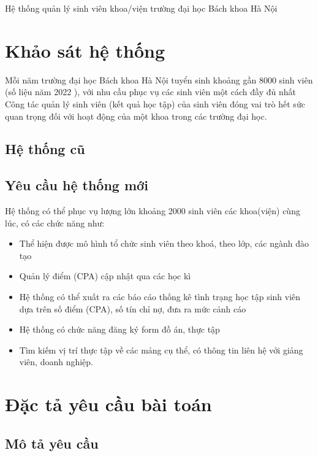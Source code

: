 \documentclass[12pt, a4paper]{report}
\begin{document}
Hệ thống quản lý sinh viên khoa/viện trường đại học Bách khoa Hà Nội
\chapter{Khảo sát hệ thống}
Mỗi năm trường đại học Bách khoa Hà Nội tuyển sinh khoảng gần 8000 sinh viên (số liệu năm 2022 ), với nhu cầu phục vụ các sinh viên một cách đầy đủ nhất\\
Công tác quản lý sinh viên (kết quả học tập) của sinh viên đóng vai trò hết sức quan trọng đối với hoạt động của một khoa trong các trường đại học.
\section{Hệ thống cũ}

\section{Yêu cầu hệ thống mới}
Hệ thống có thể phục vụ lượng lớn khoảng 2000
sinh viên các khoa(viện) cùng lúc, có các chức năng như:
\begin{itemize}
    \item Thể hiện được mô hình tổ chức sinh viên theo khoá, theo lớp, các ngành đào tạo
    \item Quản lý điểm (CPA) cập nhật qua các học kì
    \item Hệ thống có thể xuất ra các báo cáo thống kê tình trạng học tập sinh viên dựa trên số điểm (CPA), số tín chỉ nợ, đưa ra mức cảnh cáo
    \item Hệ thống có chức năng đăng ký form đồ án, thực tập
    \item Tìm kiếm vị trí thực tập về các mảng cụ thể, có thông tin liên hệ với giảng viên, doanh nghiệp.
\end{itemize}

\chapter{Đặc tả yêu cầu bài toán}
\section{Mô tả yêu cầu}
\end{document}
